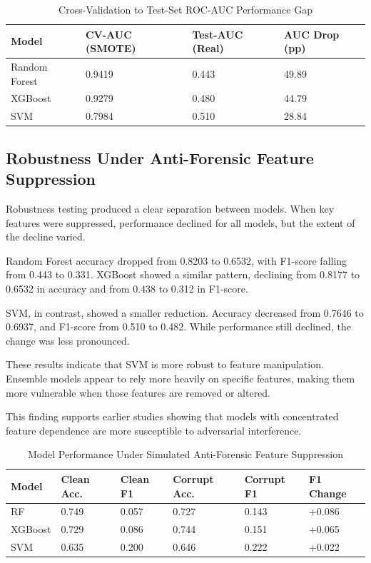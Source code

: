 \begin{table}
\centering
\caption{Cross-Validation to Test-Set ROC-AUC Performance Gap}
\label{tab:rocauc}

\begin{tabular}{| l | l | l | l |}
\hline
\textbf{Model} & \textbf{CV-AUC (SMOTE)} & \textbf{Test-AUC (Real)} & \textbf{AUC Drop (pp)} \\
\hline
Random Forest & 0.9419 & 0.443 & 49.89 \\
\hline
XGBoost & 0.9279 & 0.480 & 44.79 \\
\hline
SVM & 0.7984 & 0.510 & 28.84 \\
\hline

\end{tabular}

\end{table}

\subsection{Robustness Under Anti-Forensic Feature Suppression}
Robustness testing produced a clear separation between models. When key features were suppressed, performance declined for all models, but the extent of the decline varied.

Random Forest accuracy dropped from 0.8203 to 0.6532, with F1-score falling from 0.443 to 0.331. XGBoost showed a similar pattern, declining from 0.8177 to 0.6532 in accuracy and from 0.438 to 0.312 in F1-score.

SVM, in contrast, showed a smaller reduction. Accuracy decreased from 0.7646 to 0.6937, and F1-score from 0.510 to 0.482. While performance still declined, the change was less pronounced.

These results indicate that SVM is more robust to feature manipulation. Ensemble models appear to rely more heavily on specific features, making them more vulnerable when those features are removed or altered.

This finding supports earlier studies showing that models with concentrated feature dependence are more susceptible to adversarial interference.




\begin{table}
\centering
\caption{ Model Performance Under Simulated Anti-Forensic Feature Suppression}
\label{tab:mp}

\begin{tabular}{| l | l | l | l | l | l |}
\hline
\textbf{Model} & \textbf{Clean Acc.} & \textbf{Clean F1} & \textbf{Corrupt Acc.} & \textbf{Corrupt F1} & \textbf{F1 Change} \\
\hline
RF & 0.749 & 0.057 & 0.727 & 0.143 & +0.086 \\
\hline
XGBoost & 0.729 & 0.086 & 0.744 & 0.151 & +0.065 \\
\hline
SVM & 0.635 & 0.200 & 0.646 & 0.222 & +0.022 \\
\hline

\end{tabular}

\end{table}


